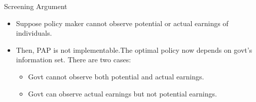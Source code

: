 \documentclass{beamer}
\begin{document}
\begin{frame}[allowframebreaks]{Screening Argument}

    \begin{itemize}
        \item Suppose policy maker cannot observe potential or actual earnings of individuals. 
        \item Then, PAP is not implementable.The optimal policy now depends on govt's information set. There are two cases:
        \begin{itemize}
            \item Govt cannot observe both potential and actual earnings.
            \item Govt can observe actual earnings but not potential earnings.
        \end{itemize}
    \end{itemize}
\end{frame}
\end{document}

